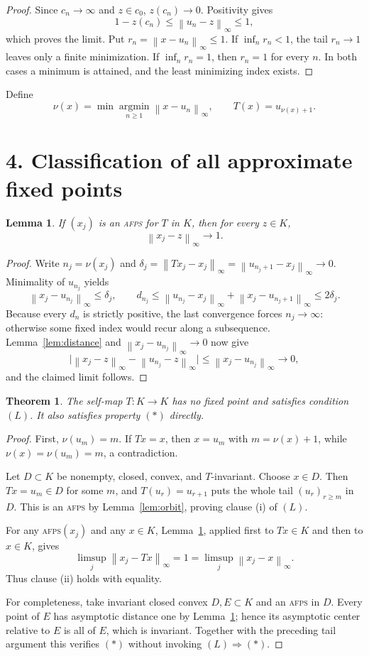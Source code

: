 \documentclass[10pt]{article}
\newtheorem{theorem}{Theorem}
\newtheorem{lemma}{Lemma}
\newcommand{\norm}[1]{\left\lVert #1\right\rVert_\infty}
\newcommand{\afps}{\textnormal{\textsc{afps}}\xspace}
\begin{document}
\begin{proof}
Since $c_n\to\infty$ and $z\in c_0$, $z(c_n)\to0$.  Positivity gives
\[
 1-z(c_n)\leq\norm{u_n-z}\leq1,
\]
which proves the limit.  Put $r_n=\norm{x-u_n}\leq1$.  If
$\inf_n r_n<1$, the tail $r_n\to1$ leaves only a finite minimization.  If
$\inf_n r_n=1$, then $r_n=1$ for every $n$.  In both cases a minimum is
attained, and the least minimizing index exists.
\end{proof}

Define
\[
 \nu(x)=\min\operatorname*{argmin}_{n\geq1}\norm{x-u_n},
 \qquad T(x)=u_{\nu(x)+1}.
\]

\section*{4. Classification of all approximate fixed points}

\begin{lemma}\label{lem:afps}
If $(x_j)$ is an \afps for $T$ in $K$, then for every $z\in K$,
\[
 \norm{x_j-z}\longrightarrow1.
\]
\end{lemma}

\begin{proof}
Write $n_j=\nu(x_j)$ and
$\delta_j=\norm{Tx_j-x_j}=\norm{u_{n_j+1}-x_j}\to0$.  Minimality of
$u_{n_j}$ yields
\[
 \norm{x_j-u_{n_j}}\leq\delta_j,
 \qquad d_{n_j}\leq\norm{u_{n_j}-x_j}
       +\norm{x_j-u_{n_j+1}}\leq2\delta_j.
\]
Because every $d_n$ is strictly positive, the last convergence forces
$n_j\to\infty$: otherwise some fixed index would recur along a subsequence.
Lemma~\ref{lem:distance} and $\norm{x_j-u_{n_j}}\to0$ now give
\[
 \big|\norm{x_j-z}-\norm{u_{n_j}-z}\big|
 \leq\norm{x_j-u_{n_j}}\longrightarrow0,
\]
and the claimed limit follows.
\end{proof}

\begin{theorem}\label{thm:counterexample}
The self-map $T:K\to K$ has no fixed point and satisfies condition $(L)$.
It also satisfies property $(*)$ directly.
\end{theorem}

\begin{proof}
First, $\nu(u_m)=m$.  If $Tx=x$, then $x=u_m$ with
$m=\nu(x)+1$, while $\nu(x)=\nu(u_m)=m$, a contradiction.

Let $D\subset K$ be nonempty, closed, convex, and $T$-invariant.  Choose
$x\in D$.  Then $Tx=u_m\in D$ for some $m$, and
$T(u_r)=u_{r+1}$ puts the whole tail $(u_r)_{r\geq m}$ in $D$.  This is an
\afps by Lemma~\ref{lem:orbit}, proving clause (i) of $(L)$.

For any \afps $(x_j)$ and any $x\in K$, Lemma~\ref{lem:afps}, applied first
to $Tx\in K$ and then to $x\in K$, gives
\[
 \limsup_j\norm{x_j-Tx}=1=\limsup_j\norm{x_j-x}.
\]
Thus clause (ii) holds with equality.

For completeness, take invariant closed convex $D,E\subset K$ and an \afps
in $D$.  Every point of $E$ has asymptotic distance one by
Lemma~\ref{lem:afps}; hence its asymptotic center relative to $E$ is all of
$E$, which is invariant.  Together with the preceding tail argument this
verifies $(*)$ without invoking $(L)\Rightarrow(*)$.
\end{proof}
\end{document}

